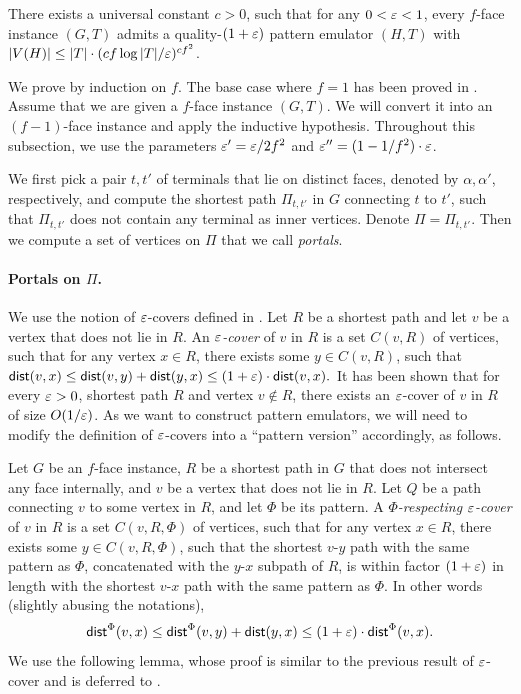 \begin{lemma}
\label{lem: O(1) face emulator}
There exists a universal constant $c>0$, such that for any $0<{\varepsilon}<1$, every $f$-face instance $(G,T)$ admits a quality-$(1+{\varepsilon})$ pattern emulator $(H,T)$ with $|V(H)|\le |T|\cdot (cf\log |T|/{\varepsilon})^{cf^2}$.
\end{lemma}

We prove  by induction on $f$. The base case where $f=1$ has been proved in .
Assume that we are given a $f$-face instance $(G,T)$.
We will convert it into an $(f-1)$-face instance and apply the inductive hypothesis.
Throughout this subsection, we use the parameters ${\varepsilon}'={\varepsilon}/2f^2$ and ${\varepsilon}''=(1-1/f^2)\cdot {\varepsilon}$.

We first pick a pair $t,t'$ of terminals that lie on distinct faces, denoted by $\alpha,\alpha'$, respectively, and compute the shortest path $\Pi_{t,t'}$ in $G$ connecting $t$ to $t'$, such that $\Pi_{t,t'}$ does not contain any terminal as inner vertices. Denote $\Pi=\Pi_{t,t'}$. Then we compute a set of vertices on $\Pi$ that we call \emph{portals}. 

\paragraph{Portals on $\Pi$.}
We use the notion of ${\varepsilon}$-covers defined in \cite{klein1998fully,thorup2004compact}.
Let $R$ be a shortest path and let $v$ be a vertex that does not lie in $R$. An \emph{${\varepsilon}$-cover} of $v$ in $R$ is a set $C(v,R)$ of vertices, such that for any vertex $x\in R$, there exists some $y\in C(v,R)$, such that 
$\textnormal{\textsf{dist}}(v,x)\le \textnormal{\textsf{dist}}(v,y)+\textnormal{\textsf{dist}}(y,x)\le (1+{\varepsilon})\cdot\textnormal{\textsf{dist}}(v,x).$
It has been shown \cite{klein1998fully,thorup2004compact} that for every ${\varepsilon}>0$, shortest path $R$ and vertex $v\notin R$, there exists an ${\varepsilon}$-cover of $v$ in $R$ of size $O(1/{\varepsilon})$.
%
As we want to construct pattern emulators, we will need to modify the definition of ${\varepsilon}$-covers into a ``pattern version'' accordingly, as follows.

Let $G$ be an $f$-face instance, $R$ be a shortest path in $G$ that does not intersect any face internally, and $v$ be a vertex that does not lie in $R$. 
Let $Q$ be a path connecting $v$ to some vertex in $R$, and let $\Phi$ be its pattern. A \emph{$\Phi$-respecting ${\varepsilon}$-cover} of $v$ in $R$ is a set $C(v,R,\Phi)$ of vertices, such that for any vertex $x\in R$, there exists some $y\in C(v,R,\Phi)$, such that the shortest $v$-$y$ path with the same pattern as $\Phi$, concatenated with the $y$-$x$ subpath of $R$, is within factor $(1+{\varepsilon})$ in length with the shortest $v$-$x$ path with the same pattern as $\Phi$. In other words (slightly abusing the notations),
$$\textnormal{\textsf{dist}}^\Phi(v,x)\le \textnormal{\textsf{dist}}^\Phi(v,y)+\textnormal{\textsf{dist}}(y,x)\le (1+{\varepsilon})\cdot\textnormal{\textsf{dist}}^\Phi(v,x).$$
We use the following lemma, whose proof is similar to the previous result of ${\varepsilon}$-cover and is deferred to .

